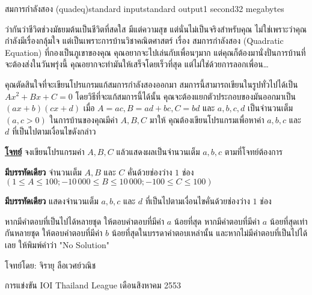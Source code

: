 \documentclass[11pt,a4paper]{article}
\begin{document}
\begin{problem}{สมการกำลังสอง (quadeq)}{standard input}{standard output}{1 second}{32 megabytes}

ว่ากันว่าชีวิตช่วงมัธยมต้นเป็นชีวิตที่สดใส มีแต่ความสุข แต่นั่นไม่เป็นจริงสำหรับคุณ ไม่ใช่เพราะว่าคุณกำลังมีเรื่องกลุ้มใจ แต่เป็นเพราะการบ้านวิชาคณิตศาสตร์ เรื่อง สมการกำลังสอง (Quadratic Equation) ที่กองเป็นภูเขาของคุณ คุณอยากจะไปเล่นกับเพื่อนๆมาก แต่คุณก็ต้องมานั่งปั่นการบ้านที่จะต้องส่งในวันพรุ่งนี้ คุณอยากจะทำมันให้เสร็จโดยเร็วที่สุด แต่ไม่ใช่ด้วยการลอกเพื่อน…

คุณตัดสินใจที่จะเขียนโปรแกรมแก้สมการกำลังสองออกมา สมการนี้สามารถเขียนในรูปทั่วไปได้เป็น $Ax^2 + Bx + C = 0$ โดยวิธีที่จะแก้สมการนี้ได้นั้น คุณจะต้องแยกตัวประกอบของมันออกมาเป็น $(ax + b)(cx + d)$ เมื่อ $A = ac, B = ad + bc, C = bd$ และ $a, b, c, d$ เป็นจำนวนเต็ม $(a,c > 0)$ ในการบ้านของคุณมีค่า $A, B, C$ มาให้ คุณต้องเขียนโปรแกรมเพื่อหาค่า $a, b, c$ และ $d$ ที่เป็นไปตามเงื่อนไขดังกล่าว

\underline{\textbf{โจทย์}} จงเขียนโปรแกรมค่า $A,B,C$ แล้วแสดงผลเป็นจำนวนเต็ม $a,b,c$ ตามที่โจทย์ต้องการ

\InputFile

\textbf{มีบรรทัดเดียว} จำนวนเต็ม $A, B$ และ $C$ คั่นด้วยช่องว่าง $1$ ช่อง $(1  \leq  A  \leq  100;  -10\,000 \leq B \leq 10\,000;  -100 \leq C \leq 100)$

\OutputFile

\textbf{มีบรรทัดเดียว} แสดงจำนวนเต็ม $a, b, c$ และ $d$ ที่เป็นไปตามเงื่อนไขคั่นด้วยช่องว่าง $1$ ช่อง

หากมีคำตอบที่เป็นไปได้หลายชุด ให้ตอบคำตอบที่มีค่า $a$ น้อยที่สุด หากมีคำตอบที่มีค่า $a$ น้อยที่สุดเท่ากันหลายชุด ให้ตอบคำตอบที่มีค่า $b$ น้อยที่สุดในบรรดาคำตอบเหล่านั้น และหากไม่มีคำตอบที่เป็นไปได้เลย ให้พิมพ์คำว่า "No Solution"

\Examples

\begin{example}
%
%
\end{example}

\Source

โจทย์โดย: จิรายุ ลือเวศย์วณิช

การแข่งขัน IOI Thailand League เดือนสิงหาคม 2553

\end{problem}
\end{document}
